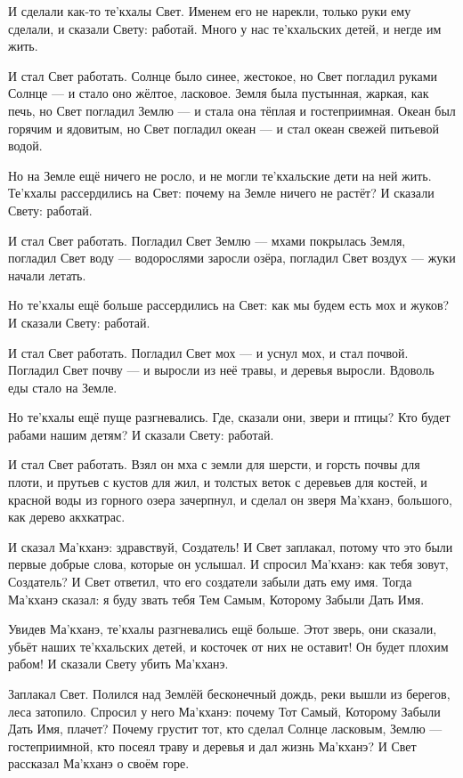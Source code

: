 И сделали как-то те'кхалы Свет.
Именем его не нарекли, только руки ему сделали, и сказали Свету: работай.
Много у нас те'кхальских детей, и негде им жить.

И стал Свет работать.
Солнце было синее, жестокое, но Свет погладил руками Солнце --- и стало оно жёлтое, ласковое.
Земля была пустынная, жаркая, как печь, но Свет погладил Землю --- и стала она тёплая и гостеприимная.
Океан был горячим и ядовитым, но Свет погладил океан --- и стал океан свежей питьевой водой.

Но на Земле ещё ничего не росло, и не могли те'кхальские дети на ней жить.
Те'кхалы рассердились на Свет: почему на Земле ничего не растёт?
И сказали Свету: работай.

И стал Свет работать.
Погладил Свет Землю --- мхами покрылась Земля, погладил Свет воду --- водорослями заросли озёра, погладил Свет воздух --- жуки начали летать.

Но те'кхалы ещё больше рассердились на Свет: как мы будем есть мох и жуков?
И сказали Свету: работай.

И стал Свет работать.
Погладил Свет мох --- и уснул мох, и стал почвой.
Погладил Свет почву --- и выросли из неё травы, и деревья выросли.
Вдоволь еды стало на Земле.

Но те'кхалы ещё пуще разгневались.
Где, сказали они, звери и птицы?
Кто будет рабами нашим детям?
И сказали Свету: работай.

И стал Свет работать.
Взял он мха с земли для шерсти, и горсть почвы для плоти, и прутьев с кустов для жил, и толстых веток с деревьев для костей, и красной воды из горного озера зачерпнул, и сделал он зверя Ма'кханэ\footnotemark, большого, как дерево акхкатрас.

И сказал Ма'кханэ: здравствуй, Создатель!
И Свет заплакал, потому что это были первые добрые слова, которые он услышал.
И спросил Ма'кханэ: как тебя зовут, Создатель?
И Свет ответил, что его создатели забыли дать ему имя.
Тогда Ма'кханэ сказал: я буду звать тебя Тем Самым, Которому Забыли Дать Имя.

Увидев Ма'кханэ, те'кхалы разгневались ещё больше.
Этот зверь, они сказали, убьёт наших те'кхальских детей, и косточек от них не оставит!
Он будет плохим рабом!
И сказали Свету убить Ма'кханэ.

Заплакал Свет.
Полился над Землёй бесконечный дождь, реки вышли из берегов, леса затопило.
Спросил у него Ма'кханэ: почему Тот Самый, Которому Забыли Дать Имя, плачет?
Почему грустит тот, кто сделал Солнце ласковым, Землю --- гостеприимной, кто посеял траву и деревья и дал жизнь Ма'кханэ?
И Свет рассказал Ма'кханэ о своём горе.

